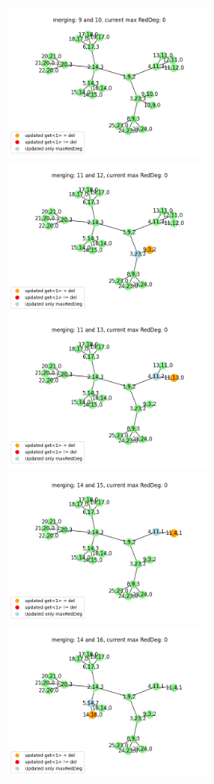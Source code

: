 \documentclass[10pt]{article}
\begin{document}
\includegraphics[width=0.5\textwidth]{images/merge0.png}
\includegraphics[width=0.5\textwidth]{images/merge1.png}
\includegraphics[width=0.5\textwidth]{images/merge2.png}
\includegraphics[width=0.5\textwidth]{images/merge3.png}
\includegraphics[width=0.5\textwidth]{images/merge4.png}
\end{document}
